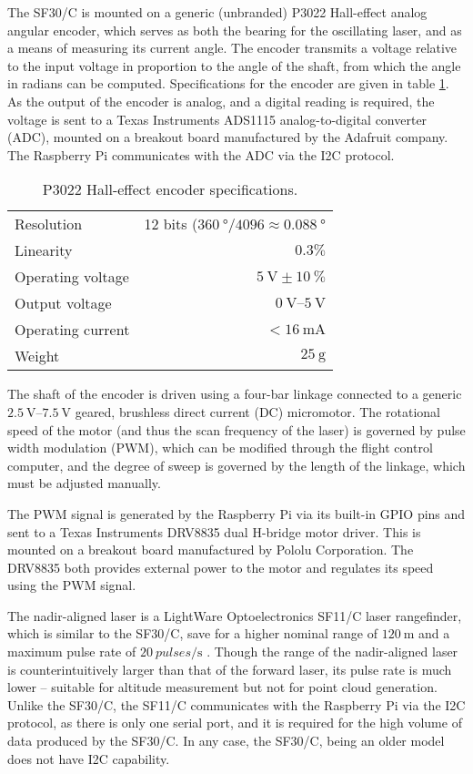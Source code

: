 The SF30/C is mounted on a generic (unbranded) P3022 Hall-effect analog angular encoder, which serves as both the bearing for the oscillating laser, and as a means of measuring its current angle. The encoder transmits a voltage relative to the input voltage in proportion to the angle of the shaft, from which the angle in radians can be computed. Specifications for the encoder are given in table \ref{table:encoderspecs}. As the output of the encoder is analog, and a digital reading is required, the voltage is sent to a Texas Instruments ADS1115 analog-to-digital converter (ADC), mounted on a breakout board manufactured by the Adafruit company. The Raspberry Pi communicates with the ADC via the I2C protocol.

\begin{table}
\begin{center}
\begin{tabular}{l r}
\hline
Resolution & 12 bits ($\SI{360}{\degree} / 4096 \approx \SI{0.088}{\degree}$ \\
Linearity & $0.3\percent$ \\
Operating voltage & $\SI{5}{\volt} \pm \SI{10}{\percent}$ \\
Output voltage & $\SIrange{0}{5}{\volt}$ \\
Operating current & $< \SI{16}{\milli\ampere}$  \\ 
Weight & $\SI{25}{\gram}$ \\
\hline
\end{tabular}
\end{center}
\caption{P3022 Hall-effect encoder specifications.}
\label{table:encoderspecs}
\end{table}

The shaft of the encoder is driven using a four-bar linkage connected to a generic $\SIrange{2.5}{7.5}{\volt}$ geared, brushless direct current (DC) micromotor. The rotational speed of the motor (and thus the scan frequency of the laser) is governed by pulse width modulation (PWM), which can be modified through the flight control computer, and the degree of sweep is governed by the length of the linkage, which must be adjusted manually. 

The PWM signal is generated by the Raspberry Pi via its built-in GPIO pins and sent to a Texas Instruments DRV8835 dual H-bridge motor driver. This is mounted on a breakout board manufactured by Pololu Corporation. The DRV8835 both provides external power to the motor and regulates its speed using the PWM signal.

The nadir-aligned laser is a LightWare Optoelectronics SF11/C laser rangefinder, which is similar to the SF30/C, save for a higher nominal range of $\SI{120}{\metre}$ and a maximum pulse rate of $\SI{20}{pulses\per\second}$  \cite{LightWareOptoelectronics2018}. Though the range of the nadir-aligned laser is counterintuitively larger than that of the forward laser, its pulse rate is much lower -- suitable for altitude measurement but not for point cloud generation. Unlike the SF30/C, the SF11/C communicates with the Raspberry Pi via the I2C protocol, as there is only one serial port, and it is required for the high volume of data produced by the SF30/C. In any case, the SF30/C, being an older model does not have I2C capability.

